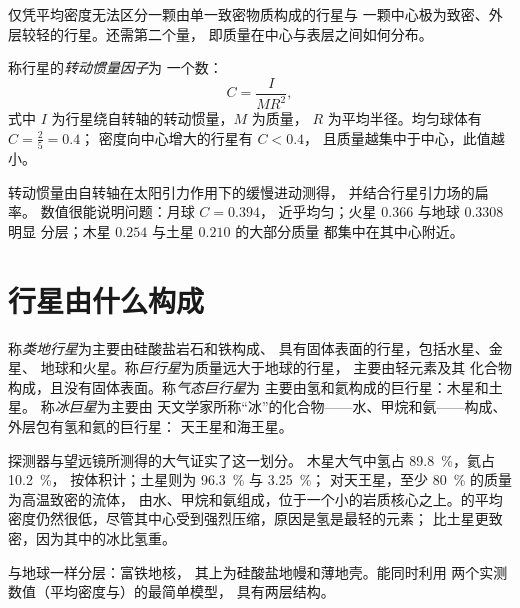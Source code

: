 仅凭平均密度无法区分一颗由单一致密物质构成的行星与
一颗中心极为致密、外层较轻的行星。还需第二个量，
即质量在中心与表层之间如何分布。

\begin{definition}[转动惯量因子]\label{def:b1:comparative-planetology:moi}
称行星的\emph{转动惯量因子}为
一个数：
\[
  C = \frac{I}{MR^2} ,
\]
式中 $I$ 为行星绕自转轴的转动惯量，$M$ 为质量，
$R$ 为平均半径。均匀球体有 $C = \tfrac25 = 0.4$；
密度向中心增大的行星有 $C < 0.4$，
且质量越集中于中心，此值越小。
\end{definition}

转动惯量由自转轴在太阳引力作用下的缓慢进动测得，
并结合行星引力场的扁率。
数值很能说明问题：月球 $C = 0.394$，
近乎均匀；火星 $0.366$ 与地球 $0.3308$ 明显
分层；木星 $0.254$ 与土星 $0.210$ 的大部分质量
都集中在其中心附近。

\section{行星由什么构成}

\begin{definition}[类地行星与巨行星]\label{def:b1:comparative-planetology:planet-types}
称\emph{类地行星}为主要由硅酸盐岩石和铁构成、
具有固体表面的行星，包括水星、金星、
地球和火星。称\emph{巨行星}为质量远大于地球的行星，
主要由轻元素及其
化合物构成，且没有固体表面。称\emph{气态巨行星}为
主要由氢和氦构成的巨行星：木星和土星。
称\emph{冰巨星}为主要由
天文学家所称“冰”的化合物——水、甲烷和氨——构成、外层包有氢和氦的巨行星：
天王星和海王星。
\end{definition}

探测器与望远镜所测得的大气证实了这一划分。
木星大气中氢占 \qty{89.8}{\percent}，氦占 \qty{10.2}{\percent}，
按体积计；土星则为 \qty{96.3}{\percent} 与 \qty{3.25}{\percent}；
对天王星，至少 \qty{80}{\percent} 的质量为高温致密的流体，
由水、甲烷和氨组成，位于一个小的岩质核心之上。的平均
密度仍然很低，尽管其中心受到强烈压缩，原因是氢是最轻的元素；
比土星更致密，因为其中的冰比氢重。

与地球一样分层：富铁地核，
其上为硅酸盐地幔和薄地壳。能同时利用
两个实测数值（平均密度与）的最简单模型，
具有两层结构。

